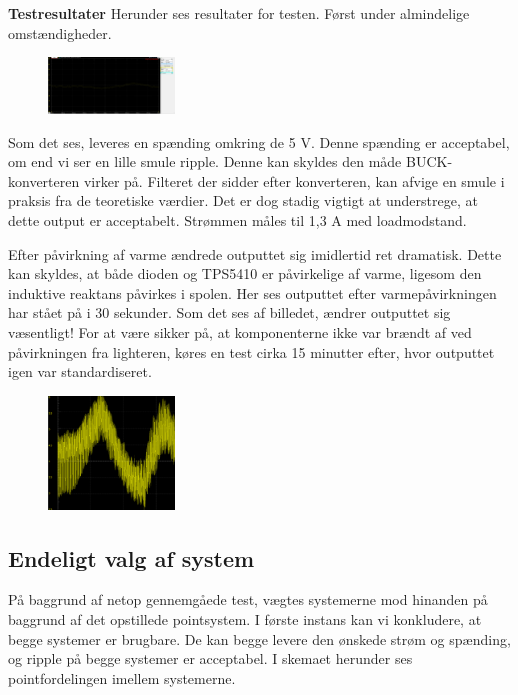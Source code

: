 \textbf{Testresultater}\newline
Herunder ses resultater for testen. Først under almindelige omstændigheder.

\begin{figure}[h]
  \centering
  \includegraphics[width=0.3\textwidth]{bil7.png}
  \caption{}
  \label{fig:bil688}
\end{figure}
\clearpage
Som det ses, leveres en spænding omkring de 5 V. Denne spænding er acceptabel, om end vi ser en lille smule ripple. Denne kan skyldes den måde BUCK-konverteren virker på. Filteret der sidder efter konverteren, kan afvige en smule i praksis fra de teoretiske værdier. Det er dog stadig vigtigt at understrege, at dette output er acceptabelt. Strømmen måles til 1,3 A med loadmodstand.

Efter påvirkning af varme ændrede outputtet sig imidlertid ret dramatisk. Dette kan skyldes, at både dioden og TPS5410 er påvirkelige af varme, ligesom den induktive reaktans påvirkes i spolen. Her ses outputtet efter varmepåvirkningen har stået på i 30 sekunder. 
Som det ses af billedet, ændrer outputtet sig væsentligt! 
For at være sikker på, at komponenterne ikke var brændt af ved påvirkningen fra lighteren, køres en test cirka 15 minutter efter, hvor outputtet igen var standardiseret. 

\begin{figure}[h]
  \centering
  \includegraphics[width=0.3\textwidth]{bil8.png}
  \caption{}
  \label{fig:bil6}
\end{figure}

\subsection{Endeligt valg af system }
\label{sec:endeligt-valg-af}

På baggrund af netop gennemgåede test, vægtes systemerne mod hinanden på baggrund af det opstillede pointsystem. 
I første instans kan vi konkludere, at begge systemer er brugbare. De kan begge levere den ønskede strøm og spænding, og ripple på begge systemer er acceptabel. I skemaet herunder ses pointfordelingen imellem systemerne. 

